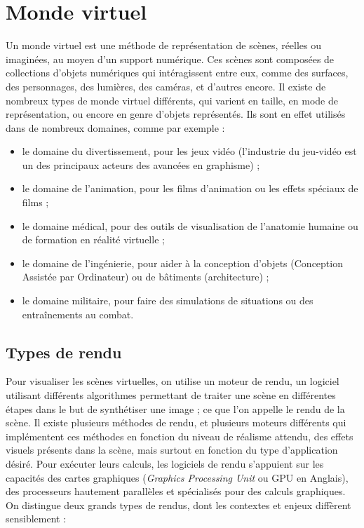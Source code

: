 \section{Monde virtuel}

Un monde virtuel est une méthode de représentation de scènes, réelles ou imaginées, au moyen d'un support numérique. Ces scènes sont composées de collections d'objets numériques qui intéragissent entre eux, comme des surfaces, des personnages, des lumières, des caméras, et d'autres encore. Il existe de nombreux types de monde virtuel différents, qui varient en taille, en mode de représentation, ou encore en genre d'objets représentés. Ils sont en effet utilisés dans de nombreux domaines, comme par exemple :

\begin{itemize}
    \item le domaine du divertissement, pour les jeux vidéo (l'industrie du jeu-vidéo est un des principaux acteurs des avancées en graphisme) ;
    \item le domaine de l'animation, pour les films d'animation ou les effets spéciaux de films ;
    \item le domaine médical, pour des outils de visualisation de l'anatomie humaine ou de formation en réalité virtuelle ;
    \item le domaine de l'ingénierie, pour aider à la conception d'objets (Conception Assistée par Ordinateur) ou de bâtiments (architecture) ;
    \item le domaine militaire, pour faire des simulations de situations ou des entraînements au combat.
\end{itemize}

\subsection*{Types de rendu}

Pour visualiser les scènes virtuelles, on utilise un moteur de rendu, un logiciel utilisant différents algorithmes permettant de traiter une scène en différentes étapes dans le but de synthétiser une image ; ce que l'on appelle le rendu de la scène. Il existe plusieurs méthodes de rendu, et plusieurs moteurs différents qui implémentent ces méthodes en fonction du niveau de réalisme attendu, des effets visuels présents dans la scène, mais surtout en fonction du type d'application désiré. Pour exécuter leurs calculs, les logiciels de rendu s'appuient sur les capacités des cartes graphiques ({\it Graphics Processing Unit} ou GPU en Anglais), des processeurs hautement parallèles et spécialisés pour des calculs graphiques. On distingue deux grands types de rendus, dont les contextes et enjeux diffèrent sensiblement :

